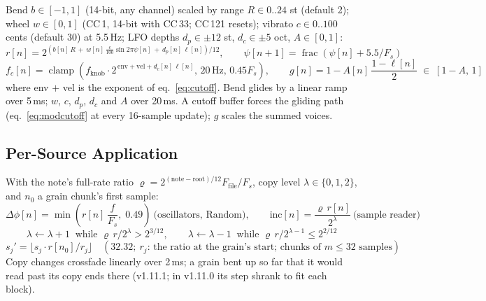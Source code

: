 \documentclass[11pt,letterpaper]{article}
\newcommand{\Fs}{F_s}
\newcommand{\frc}{\operatorname{frac}}
\newcommand{\clamp}{\operatorname{clamp}}
\newcommand{\lfo}{\ell}
\begin{document}
Bend $b\in[-1,1]$ (14-bit, any channel) scaled by range $R \in 0..24$ st (default 2); wheel $w\in[0,1]$ (CC\,1, 14-bit with CC\,33; CC\,121
resets); vibrato $c \in 0..100$ cents (default 30) at 5.5\,Hz; LFO depths $d_p \in \pm 12$ st, $d_c \in \pm 5$ oct, $A\in[0,1]$:
\begin{equation}\label{eq:ratio}
  r[n] = 2^{\left(b[n]\,R \,+\, w[n]\,\frac{c}{100}\sin 2\pi\psi[n] \,+\, d_p[n]\,\lfo[n]\right)/12}, \qquad \psi[n+1] = \frc\!\left(\psi[n] + 5.5/\Fs\right)
\end{equation}
\begin{equation}\label{eq:modcutoff}
  f_c[n] = \clamp\!\left(f_{\mathrm{knob}} \cdot 2^{\,\mathrm{env} + \mathrm{vel} + d_c[n]\,\lfo[n]},\, 20\,\mathrm{Hz},\, 0.45\Fs\right), \qquad
  g[n] = 1 - A[n]\,\frac{1 - \lfo[n]}{2} \;\in\; [1 - A,\, 1]
\end{equation}
where env $+$ vel is the exponent of eq.~\eqref{eq:cutoff}. Bend glides by a linear ramp over 5\,ms; $w$, $c$, $d_p$, $d_c$ and $A$ over 20\,ms.
A cutoff buffer forces the gliding path (eq.~\eqref{eq:modcutoff} at every 16-sample update); $g$ scales the summed voices.

\subsection{Per-Source Application}

With the note's full-rate ratio $\varrho = 2^{(\mathrm{note}-\mathrm{root})/12} F_{\mathrm{file}}/\Fs$, copy level $\lambda \in \{0,1,2\}$, and $n_0$ a grain chunk's first sample:
\begin{equation}\label{eq:oscstep}
  \Delta\phi[n] = \min\!\left(r[n]\,\frac{f}{\Fs},\; 0.49\right) \ \text{(oscillators, Random)}, \qquad
  \mathrm{inc}[n] = \frac{\varrho\, r[n]}{2^{\lambda}} \ \text{(sample reader)}
\end{equation}
\begin{equation}\label{eq:levels}
  \lambda \leftarrow \lambda + 1 \ \text{ while } \varrho\, r/2^{\lambda} > 2^{3/12}, \qquad
  \lambda \leftarrow \lambda - 1 \ \text{ while } \varrho\, r/2^{\lambda-1} \le 2^{2/12}
\end{equation}
\begin{equation}\label{eq:grainstep}
  s_j' = \bigl\lfloor s_j \cdot r[n_0]/r_j \bigr\rfloor \quad (32.32;\ r_j\text{: the ratio at the grain's start; chunks of } m \le 32 \text{ samples})
\end{equation}
Copy changes crossfade linearly over 2\,ms; a grain bent up so far that it would read past its copy ends there (v1.11.1; in v1.11.0 its step shrank to fit each block).
\end{document}
